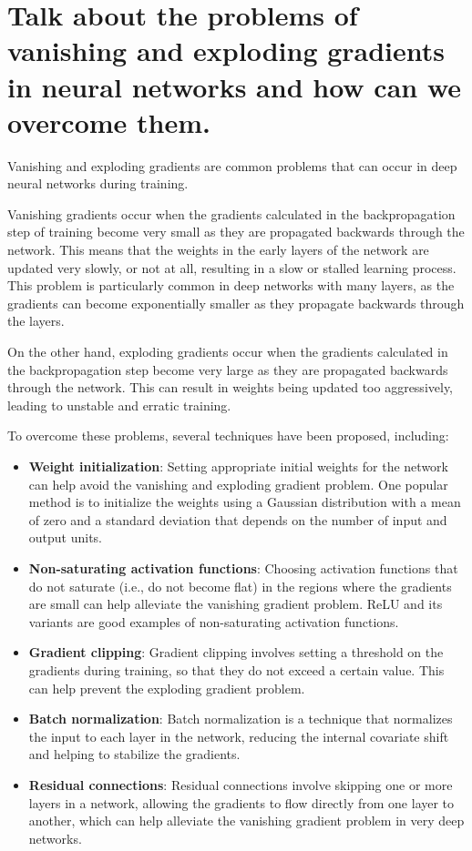 \documentclass{article}
\begin{document}
\newpage

\section*{Talk about the problems of vanishing and exploding gradients in neural networks and how can we overcome them.}

Vanishing and exploding gradients are common problems that can occur in deep neural networks during training.

Vanishing gradients occur when the gradients calculated in the backpropagation step of training become very small as they are propagated backwards through the network. This means that the weights in the early layers of the network are updated very slowly, or not at all, resulting in a slow or stalled learning process. This problem is particularly common in deep networks with many layers, as the gradients can become exponentially smaller as they propagate backwards through the layers.

On the other hand, exploding gradients occur when the gradients calculated in the backpropagation step become very large as they are propagated backwards through the network. This can result in weights being updated too aggressively, leading to unstable and erratic training.

To overcome these problems, several techniques have been proposed, including:

\begin{itemize}
    \item \textbf{Weight initialization}: Setting appropriate initial weights for the network can help avoid the vanishing and exploding gradient problem. One popular method is to initialize the weights using a Gaussian distribution with a mean of zero and a standard deviation that depends on the number of input and output units.
    \item \textbf{Non-saturating activation functions}: Choosing activation functions that do not saturate (i.e., do not become flat) in the regions where the gradients are small can help alleviate the vanishing gradient problem. ReLU and its variants are good examples of non-saturating activation functions.
    \item \textbf{Gradient clipping}: Gradient clipping involves setting a threshold on the gradients during training, so that they do not exceed a certain value. This can help prevent the exploding gradient problem.
    \item \textbf{Batch normalization}: Batch normalization is a technique that normalizes the input to each layer in the network, reducing the internal covariate shift and helping to stabilize the gradients.
    \item \textbf{Residual connections}: Residual connections involve skipping one or more layers in a network, allowing the gradients to flow directly from one layer to another, which can help alleviate the vanishing gradient problem in very deep networks.
\end{itemize}
\end{document}
